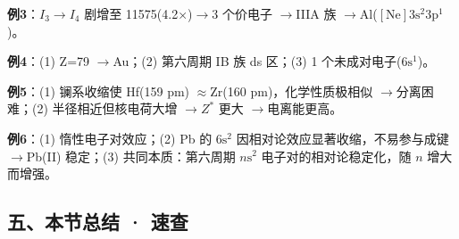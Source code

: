 \documentclass[a4paper,11pt]{ctexart}
\newcommand{\箭}{\ensuremath{\rightarrow}}
\newcommand{\左箭}{\ensuremath{\leftarrow}}
\newcommand{\上箭}{\ensuremath{\uparrow}}
\newcommand{\下箭}{\ensuremath{\downarrow}}
\newcommand{\衡}{\ensuremath{\rightleftharpoons}}
\newcommand{\双箭}{\ensuremath{\leftrightarrow}}
\newcommand{\约等于}{\ensuremath{\approx}}
\newcommand{\小于等于}{\ensuremath{\leq}}
\newcommand{\大于等于}{\ensuremath{\geq}}
\newcommand{\不等于}{\ensuremath{\neq}}
\newcommand{\西格马}{\ensuremath{\sigma}}
\newcommand{\派}{\ensuremath{\pi}}
\begin{document}
\textbf{例3}：\(I_3 \to I_4\) 剧增至 11575(4.2×)\箭 3 个价电子 \箭 IIIA 族 \箭 Al(\([\mathrm{Ne}]3\mathrm{s}^2 3\mathrm{p}^1\))。

\textbf{例4}：(1) Z=79 \箭 Au；(2) 第六周期 IB 族 ds 区；(3) 1 个未成对电子(\(6\mathrm{s}^1\))。

\textbf{例5}：(1) 镧系收缩使 Hf(159 pm) \约等于 Zr(160 pm)，化学性质极相似 \箭 分离困难；(2) 半径相近但核电荷大增 \箭 \(Z^*\) 更大 \箭 电离能更高。

\textbf{例6}：(1) 惰性电子对效应；(2) Pb 的 \(6\mathrm{s}^2\) 因相对论效应显著收缩，不易参与成键 \箭 Pb(II) 稳定；(3) 共同本质：第六周期 \(n\mathrm{s}^2\) 电子对的相对论稳定化，随 \(n\) 增大而增强。

\subsection{五、本节总结 · 速查}\label{ux4e94ux672cux8282ux603bux7ed3-ux901fux67e5}
\end{document}
